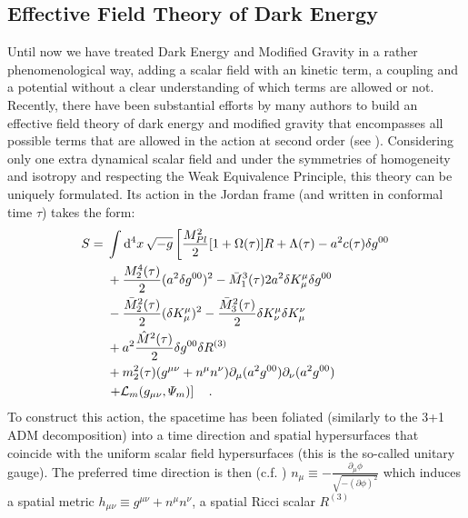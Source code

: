 \subsection{Effective Field Theory of Dark Energy \label{sub:EFT-of-DE}}

Until now we have treated Dark Energy and Modified Gravity in a rather phenomenological way,
adding a scalar field with an kinetic term, a coupling and a potential without a clear understanding
of which terms are allowed or not.
Recently, there have been substantial efforts by many authors to build an effective field theory 
of dark energy and modified gravity that encompasses all possible terms that are allowed 
in the action at second order (see \cite{Gubitosi2013, gleyzes, bloomfield}). Considering only one extra dynamical
scalar field and under the symmetries of homogeneity and isotropy and respecting the Weak Equivalence Principle,
this theory can be uniquely formulated. Its action in the Jordan frame (and written in conformal time $\tau$) takes the form:
\begin{align}\label{eq:EFT-action}
\begin{split}
S ={}& \int \mathrm{d}^{4} {x} \, \sqrt{-g} \left[ \frac{M_{Pl}^2}{2} [1 + \Omega(\tau)] R + \Lambda(\tau) -a^2 c(\tau)\delta g^{00} \right. \\
     & + \frac{M_{2}^4 (\tau)}{2}(a^2 \delta g^{00})^2 -\bar{M}_{1}^3 (\tau) 2 a^2 \delta K^\mu_\mu \delta g^{00} \\
     & - \frac{\bar{M}_2^2 (\tau)}{2} (\delta K_\mu^\mu )^2 - \frac{\bar{M}_3^2 (\tau)}{2}\delta K^{\mu}_{\nu}\delta K^{\nu}_{\mu} \\
     & + a^2 \frac{\hat{M}^2 (\tau)}{2} \delta g^{00} \delta R^{(3)} \\
     & + m^2_2(\tau) (g^{\mu \nu} + n^\mu n^\nu) \partial_{\mu} (a^2 g^{00})\partial_{\nu} (a^2 g^{00}) \\
     & \left. + \mathcal{L}_m(g_{\mu \nu}, \varPsi_m) \right] \quad.
\end{split}
\end{align}
To construct this action, the spacetime has been foliated (similarly to the 3+1 ADM decomposition) into a time direction
and spatial hypersurfaces that coincide with the uniform scalar field hypersurfaces (this is the so-called unitary gauge). 
The preferred time direction is then (c.f. \cite{gubitosi})
\beeqc$
n_\mu \equiv -\frac{\partial_{\mu}\phi}{\sqrt{-(\partial \phi)^2}}
$
which induces a spatial metric $h_{\mu \nu} \equiv g^{\mu \nu} + n^\mu n^\nu $, a spatial Ricci scalar $R^{(3)}$
